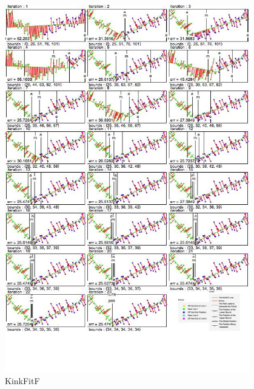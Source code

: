 \begin{figure}[h!]
  \centering
    \includegraphics[width=0.95\textwidth]{Chapter4/Figs/KinkFit_F.jpg}
    \caption{KinkFitF}\label{fig:KinkFitF}
\end{figure}

